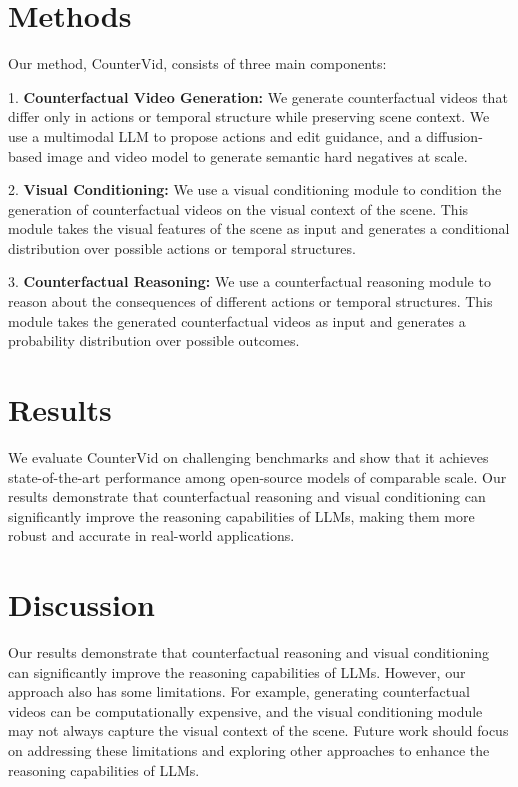 \documentclass{article}
\begin{document}
\section{Methods}

Our method, CounterVid, consists of three main components:

1. \textbf{Counterfactual Video Generation:} We generate counterfactual videos that differ only in actions or temporal structure while preserving scene context. We use a multimodal LLM to propose actions and edit guidance, and a diffusion-based image and video model to generate semantic hard negatives at scale.

2. \textbf{Visual Conditioning:} We use a visual conditioning module to condition the generation of counterfactual videos on the visual context of the scene. This module takes the visual features of the scene as input and generates a conditional distribution over possible actions or temporal structures.

3. \textbf{Counterfactual Reasoning:} We use a counterfactual reasoning module to reason about the consequences of different actions or temporal structures. This module takes the generated counterfactual videos as input and generates a probability distribution over possible outcomes.

\section{Results}

We evaluate CounterVid on challenging benchmarks and show that it achieves state-of-the-art performance among open-source models of comparable scale. Our results demonstrate that counterfactual reasoning and visual conditioning can significantly improve the reasoning capabilities of LLMs, making them more robust and accurate in real-world applications.

\section{Discussion}

Our results demonstrate that counterfactual reasoning and visual conditioning can significantly improve the reasoning capabilities of LLMs. However, our approach also has some limitations. For example, generating counterfactual videos can be computationally expensive, and the visual conditioning module may not always capture the visual context of the scene. Future work should focus on addressing these limitations and exploring other approaches to enhance the reasoning capabilities of LLMs.
\end{document}
